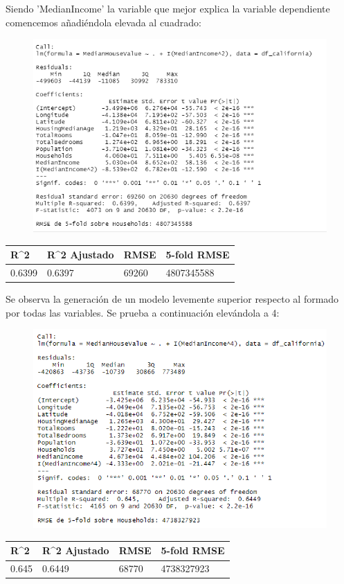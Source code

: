 \newpage
Siendo 'MedianIncome' la variable que mejor explica la variable dependiente comencemos añadiéndola elevada al cuadrado:
\begin{figure}[!h]
	\centering
	\includegraphics[width=0.7\linewidth]{figures/fit_multi_5}
	\caption{}
	\label{fig:fitmulti5}
\end{figure}

\begin{table}[!h]
	\centering
	\begin{tabular}{llll}
		R\textasciicircum{}2 & R\textasciicircum{}2 Ajustado & RMSE  & 5-fold RMSE \\ \hline
		0.6399               & 0.6397                        & 69260 & 4807345588 
	\end{tabular}
\end{table}

Se observa la generación de un modelo levemente superior respecto al formado por todas las variables.
Se prueba a continuación elevándola a 4:
\begin{figure}[!h]
	\centering
	\includegraphics[width=0.7\linewidth]{figures/fit_multi_6}
	\caption{}
	\label{fig:fitmulti6}
\end{figure}

\begin{table}[!h]
	\centering
	\begin{tabular}{llll}
		R\textasciicircum{}2 & R\textasciicircum{}2 Ajustado & RMSE  & 5-fold RMSE \\ \hline
		0.645                & 0.6449                        & 68770 & 4738327923 
	\end{tabular}
\end{table}

